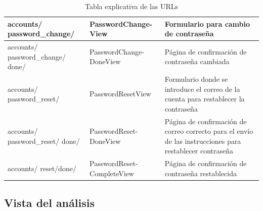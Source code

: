 \documentclass[a4paper, 12pt]{book}
\begin{document}
\begin{table}[H]
\begin{center}
\begin{tabular}{ | m{3.1cm} | m{3.3cm} | m{8.8cm} | }
        accounts/ \newline password\_change/ &
        PasswordChange-\newline View &
        Formulario para cambio de contraseña \\ \hline  
        
        accounts/ \newline 
        password\_change/ \newline done/ &
        PasswordChange-\newline DoneView &
        Página de confirmación de contraseña cambiada \\ \hline   
        
        accounts/ \newline password\_reset/ &
        PasswordResetView &
        Formulario donde se introduce el correo de la cuenta para restablecer la contraseña \\ \hline  
        
        accounts/ \newline password\_reset/ \newline done/ &
        PasswordReset- \newline DoneView &
        Página de confirmación de correo correcto para el envío de las instrucciones para restablecer contraseña \\ \hline  
        
        accounts/ \newline reset/done/ &
        PasswordReset-\newline CompleteView &
        Página de confirmación de contraseña restablecida \\ \hline 
    
    
       \end{tabular}
      \caption{Tabla explicativa de las URLs}
      \label{tabla:path-url}
     \end{center}
    \end{table}

\subsection{Vista del análisis}
\label{subsec:Vista del analisis}
\end{document}
